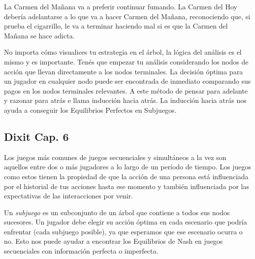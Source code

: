\documentclass{article}
\begin{document}
        La Carmen del Mañana va a preferir continuar fumando. La Carmen del Hoy debería adelantarse a lo que va a hacer Carmen del Mañana, reconociendo que, si prueba el cigarrillo, le va a terminar haciendo mal si es que la Carmen del Mañana se hace adicta.

        No importa cómo visualices tu estrategia en el árbol, la lógica del análisis es el mismo y es importante. Tenés que empezar tu análisis considerando los nodos de acción que llevan directamente a los nodos terminales. La decisión óptima para un jugador en cualquier nodo puede ser encontrada de inmediato comparando sus pagos en los nodos terminales relevantes. A este método de pensar para adelante y razonar para atrás e llama inducción hacia atrás. La inducción hacia atrás nos ayuda a conseguir los Equilibrios Perfectos en Subjuegos.

    \subsection*{\textbf{Dixit Cap. 6}}
        Los juegos más comunes de juegos secuenciales y simultáneos a la vez son aquellos entre dos o más jugadores a lo largo de un período de tiempo. Los juegos como estos tienen la propiedad de que la acción de una persona está influenciada por el historial de tus acciones hasta ese momento y también influenciada por las expectativas de las interacciones por venir.

        Un \emph{subjuego} es un subconjunto de un árbol que contiene a todos sus nodos sucesores. Un jugador debe elegir su acción óptima en cada escenario que podría enfrentar (cada subjuego posible), ya que esperamos que ese escenario ocurra o no. Esto nos puede ayudar a encontrar los Equilibrios de Nash en juegos secuenciales con información perfecta o imperfecta.
        
\end{document}
